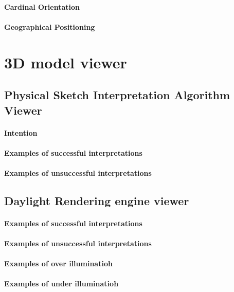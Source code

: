 \paragraph{Cardinal Orientation}
\paragraph{Geographical Positioning}

\section{3D model viewer}

\subsection{Physical Sketch Interpretation Algorithm Viewer}
\paragraph{Intention}
\paragraph{Examples of successful interpretations}
\paragraph{Examples of unsuccessful interpretations}

\subsection{Daylight Rendering engine viewer}
\paragraph{Examples of successful interpretations}
\paragraph{Examples of unsuccessful interpretations}
\paragraph{Examples of over illuminatioh}
\paragraph{Examples of under illuminatioh}

